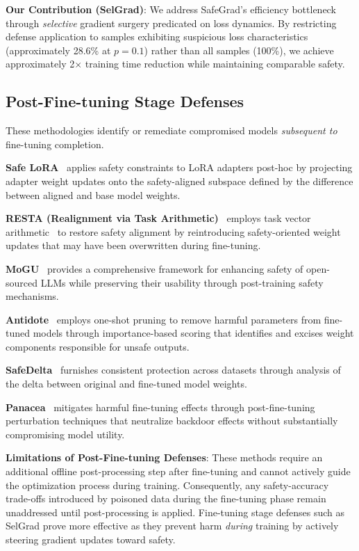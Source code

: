 \textbf{Our Contribution (SelGrad)}: We address SafeGrad's efficiency bottleneck through \textit{selective} gradient surgery predicated on loss dynamics. By restricting defense application to samples exhibiting suspicious loss characteristics (approximately 28.6\% at $p=0.1$) rather than all samples (100\%), we achieve approximately 2$\times$ training time reduction while maintaining comparable safety.

\subsection{Post-Fine-tuning Stage Defenses}
\label{subsec:post_finetuning_stage}

These methodologies identify or remediate compromised models \textit{subsequent to} fine-tuning completion.

\textbf{Safe LoRA}~\cite{hsu2024safe} applies safety constraints to LoRA adapters post-hoc by projecting adapter weight updates onto the safety-aligned subspace defined by the difference between aligned and base model weights.

\textbf{RESTA (Realignment via Task Arithmetic)}~\cite{bhardwaj2024resta} employs task vector arithmetic~\cite{ilharco2023task} to restore safety alignment by reintroducing safety-oriented weight updates that may have been overwritten during fine-tuning.

\textbf{MoGU}~\cite{li2024mogu} provides a comprehensive framework for enhancing safety of open-sourced LLMs while preserving their usability through post-training safety mechanisms.

\textbf{Antidote}~\cite{huang2024antidote} employs one-shot pruning to remove harmful parameters from fine-tuned models through importance-based scoring that identifies and excises weight components responsible for unsafe outputs.

\textbf{SafeDelta}~\cite{lu2025safedelta} furnishes consistent protection across datasets through analysis of the delta between original and fine-tuned model weights.

\textbf{Panacea}~\cite{chen2024panacea} mitigates harmful fine-tuning effects through post-fine-tuning perturbation techniques that neutralize backdoor effects without substantially compromising model utility.

\textbf{Limitations of Post-Fine-tuning Defenses}: These methods require an additional offline post-processing step after fine-tuning and cannot actively guide the optimization process during training. Consequently, any safety-accuracy trade-offs introduced by poisoned data during the fine-tuning phase remain unaddressed until post-processing is applied. Fine-tuning stage defenses such as SelGrad prove more effective as they prevent harm \textit{during} training by actively steering gradient updates toward safety.

